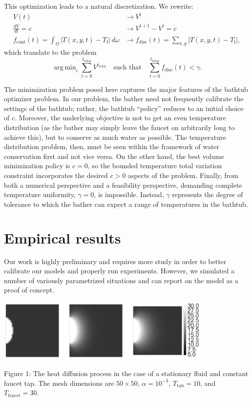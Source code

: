 \documentclass[12pt]{amsart}
\newcommand{\abs}[1]{\left|#1\right|}
\DeclareMathOperator*{\argmin}{\mathrm{arg\,min}}
\begin{document}
This optimization leads to a natural discretization. We rewrite:
\begin{align}
    V(t) &\longrightarrow V^t \\
    \frac{dV}{dt} = c &\longrightarrow V^{t+1} - V^t = c \\
    f_{\mathrm{cont}}(t) = \int_{\Omega} \abs{T(x,y,t) - T_{\mathrm{f}}} \
    d\omega &\longrightarrow f_{\mathrm{disc}}(t) = \sum_{x,y}\abs{T(x,y,t) -
        T_{\mathrm{f}}},
\end{align}
which translate to the problem
\begin{equation}
    \argmin_{c} \sum_{t=0}^{t_{\mathrm{total}}}V^{t_{\mathrm{total}}} \quad \text{such that} \quad
    \sum_{t=0}^{t_{\mathrm{total}}} f_{\mathrm{disc}}(t) < \gamma.
    \label{eq:\theequation}
\end{equation}

The minimization problem posed here captures the major features of the bathtub
optimizer problem. In our problem, the bather need not frequently calibrate the
settings of the bathtub; rather, the bathtub ``policy'' reduces to an initial
choice of $c$. Moreover, the underlying objective is not to get an even temperature
distribution (as the bather may simply leave the faucet on arbitrarily long to
achieve this), but to conserve as much water as possible. The temperature
distribution problem, then, must be seen within the framework of water
conservation first and not vice versa. On the other hand, the best volume
minimization policy is $c=0$, so the bounded temperature total variation
constraint incorporates the desired $c > 0$ aspects of the problem. Finally,
from both a numerical perspective and a feasibility perspective, demanding
complete temperature uniformity, $\gamma = 0$, is impossible. Instead, $\gamma$
represents the degree of tolerance to which the bather can expect a range of
temperatures in the bathtub.

\section{Empirical results}

Our work is highly preliminary and requires more study in order to better
calibrate our models and properly run experiments. However, we simulated a
number of variously parametrized situations and can report on the model as a
proof of concept.

\begin{center}
\includegraphics[width=0.8\textwidth]{../plots/diffusion-01.png}

\justify
\footnotesize{
Figure 1: The heat diffusion process in the case of a stationary fluid and
constant faucet tap. The mesh
dimensions are $50 \times 50$, $\alpha = 10^{-3}$, $T_{\mathrm{tub}} = 10$, and
$T_{\mathrm{faucet}} = 30$.}
\end{center}
\end{document}
